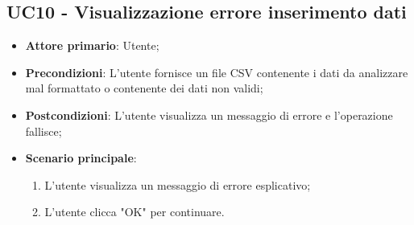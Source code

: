 \subsection{UC10 - Visualizzazione errore inserimento dati}
\begin{itemize}
	\item \textbf{Attore primario}: Utente;
	\item \textbf{Precondizioni}: L'utente fornisce un file CSV contenente i dati da analizzare mal formattato o contenente dei dati non validi;
	\item \textbf{Postcondizioni}: L'utente visualizza un messaggio di errore e l'operazione fallisce;
	\item \textbf{Scenario principale}:
		\begin{enumerate}
			\item L'utente visualizza un messaggio di errore esplicativo;
			\item L'utente clicca "OK" per continuare.
		\end{enumerate}
\end{itemize}